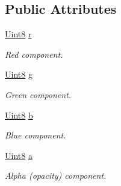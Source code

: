 \subsection*{Public Attributes}
\begin{DoxyCompactItemize}
\item 
\hyperlink{namespacesf_a4ef3d630785c4f296f9b4f274c33d78e}{Uint8} \hyperlink{classsf_1_1_color_a6a5256ca24a4f9f0e0808f6fc23e01e1}{r}
\begin{DoxyCompactList}\small\item\em Red component. \end{DoxyCompactList}\item 
\hyperlink{namespacesf_a4ef3d630785c4f296f9b4f274c33d78e}{Uint8} \hyperlink{classsf_1_1_color_a591daf9c3c55dea830c76c962d6ba1a5}{g}
\begin{DoxyCompactList}\small\item\em Green component. \end{DoxyCompactList}\item 
\hyperlink{namespacesf_a4ef3d630785c4f296f9b4f274c33d78e}{Uint8} \hyperlink{classsf_1_1_color_a6707aedd0609c8920e12df5d7abc53cb}{b}
\begin{DoxyCompactList}\small\item\em Blue component. \end{DoxyCompactList}\item 
\hyperlink{namespacesf_a4ef3d630785c4f296f9b4f274c33d78e}{Uint8} \hyperlink{classsf_1_1_color_a56dbdb47d5f040d9b78ac6a0b8b3a831}{a}
\begin{DoxyCompactList}\small\item\em Alpha (opacity) component. \end{DoxyCompactList}\end{DoxyCompactItemize}
